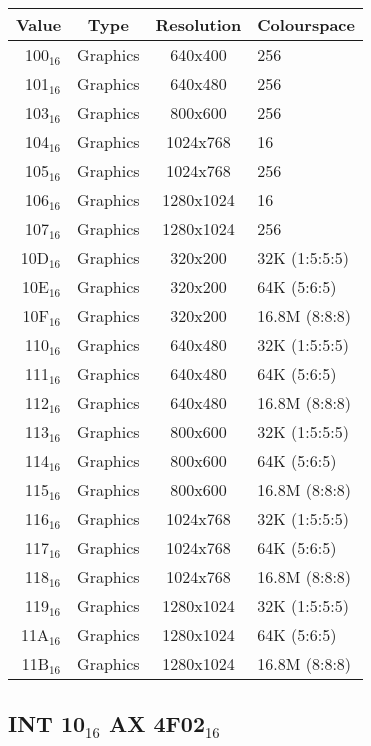 \documentclass{article}
\begin{document}
\begin{tabular}{|r|c|c|l|}
	\hline
	\textbf{Value} & \textbf{Type} & \textbf{Resolution} & \textbf{Colourspace} \\
	\hline
	100$_{16}$ & Graphics & 640x400 & 256 \\
	\hline
	101$_{16}$ & Graphics & 640x480 & 256 \\
	\hline
	103$_{16}$ & Graphics & 800x600 & 256 \\
	\hline
	104$_{16}$ & Graphics & 1024x768 & 16 \\
	\hline
	105$_{16}$ & Graphics & 1024x768 & 256 \\
	\hline
	106$_{16}$ & Graphics & 1280x1024 & 16 \\
	\hline
	107$_{16}$ & Graphics & 1280x1024 & 256 \\
	\hline
	10D$_{16}$ & Graphics & 320x200 & 32K (1:5:5:5) \\
	\hline
	10E$_{16}$ & Graphics & 320x200 & 64K (5:6:5) \\
	\hline
	10F$_{16}$ & Graphics & 320x200 & 16.8M (8:8:8) \\
	\hline
	110$_{16}$ & Graphics & 640x480 & 32K (1:5:5:5) \\
	\hline
	111$_{16}$ & Graphics & 640x480 & 64K (5:6:5) \\
	\hline
	112$_{16}$ & Graphics & 640x480 & 16.8M (8:8:8) \\
	\hline
	113$_{16}$ & Graphics & 800x600 & 32K (1:5:5:5) \\
	\hline
	114$_{16}$ & Graphics & 800x600 & 64K (5:6:5) \\
	\hline
	115$_{16}$ & Graphics & 800x600 & 16.8M (8:8:8) \\
	\hline
	116$_{16}$ & Graphics & 1024x768 & 32K (1:5:5:5) \\
	\hline
	117$_{16}$ & Graphics & 1024x768 & 64K (5:6:5) \\
	\hline
	118$_{16}$ & Graphics & 1024x768 & 16.8M (8:8:8) \\
	\hline
	119$_{16}$ & Graphics & 1280x1024 & 32K (1:5:5:5) \\
	\hline
	11A$_{16}$ & Graphics & 1280x1024 & 64K (5:6:5) \\
	\hline
	11B$_{16}$ & Graphics & 1280x1024 & 16.8M (8:8:8) \\
	\hline
\end{tabular}

\subsection{INT 10$_{16}$ AX 4F02$_{16}$}
\label{vbe enable}
\end{document}
